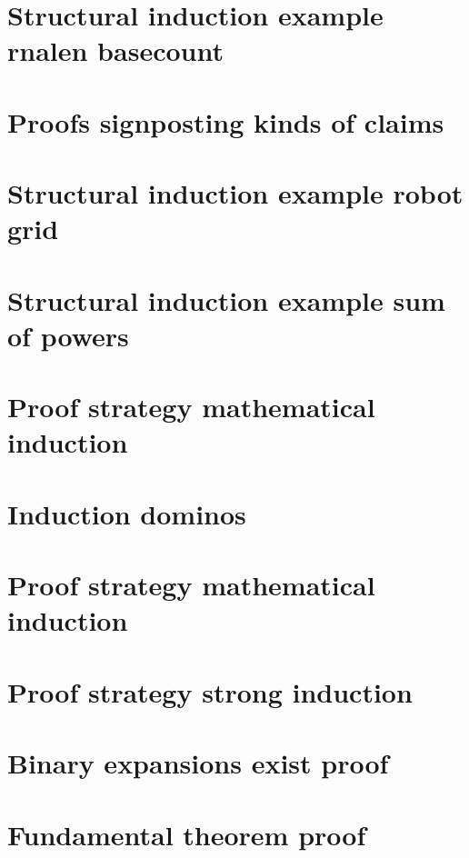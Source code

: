 \section*{Structural induction example rnalen basecount}

\vfill
\section*{Proofs signposting kinds of claims}

\vfill
\section*{Structural induction example robot grid}

\vfill
\section*{Structural induction example sum of powers}

\vfill
\section*{Proof strategy mathematical induction}

\vfill
\section*{Induction dominos}

\vfill
\section*{Proof strategy mathematical induction}

\vfill
\section*{Proof strategy strong induction}

\vfill
\section*{Binary expansions exist proof}

\vfill
\section*{Fundamental theorem proof}

\vfill
